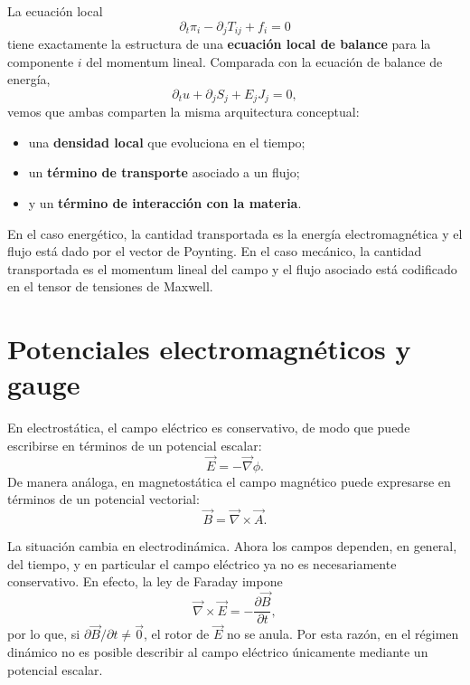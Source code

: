 \documentclass[12pt,a4paper]{article}
\theoremstyle{definition}
\theoremstyle{plain}
\numberwithin{equation}{section}
\theoremstyle{remark}
\newcommand{\E}{\vec{E}}
\newcommand{\B}{\vec{B}}
\begin{document}
La ecuación local
\begin{equation}
    \partial_t\pi_i-\partial_jT_{ij}+f_i=0
    \label{eq:momentum-balance-final}
\end{equation}
tiene exactamente la estructura de una \textbf{ecuación local de balance} para la componente $i$ del momentum lineal. Comparada con la ecuación de balance de energía,
\begin{equation}
    \partial_tu+\partial_jS_j+E_jJ_j=0,
    \label{eq:energy-balance-compact-reminder}
\end{equation}
vemos que ambas comparten la misma arquitectura conceptual:

\begin{itemize}
    \item una \textbf{densidad local} que evoluciona en el tiempo;
    \item un \textbf{término de transporte} asociado a un flujo;
    \item y un \textbf{término de interacción con la materia}.
\end{itemize}

En el caso energético, la cantidad transportada es la energía electromagnética y el flujo está dado por el vector de Poynting. En el caso mecánico, la cantidad transportada es el momentum lineal del campo y el flujo asociado está codificado en el tensor de tensiones de Maxwell.

\newpage


\section{Potenciales electromagnéticos y gauge}

En electrostática, el campo eléctrico es conservativo, de modo que puede escribirse en términos de un potencial escalar:
\begin{equation}\label{3.potencial-electrostatico}
    \E = -\vec\nabla\phi.
\end{equation}
De manera análoga, en magnetostática el campo magnético puede expresarse en términos de un potencial vectorial:
\begin{equation*}
    \B = \vec\nabla\times\vec A.
\end{equation*}

La situación cambia en electrodinámica. Ahora los campos dependen, en general, del tiempo, y en particular el campo eléctrico ya no es necesariamente conservativo. En efecto, la ley de Faraday impone
\begin{equation*}
    \vec\nabla\times\E = -\frac{\partial \B}{\partial t},
\end{equation*}
por lo que, si $\partial \B/\partial t \neq \vec 0$, el rotor de $\E$ no se anula. Por esta razón, en el régimen dinámico no es posible describir al campo eléctrico únicamente mediante un potencial escalar.
\end{document}
